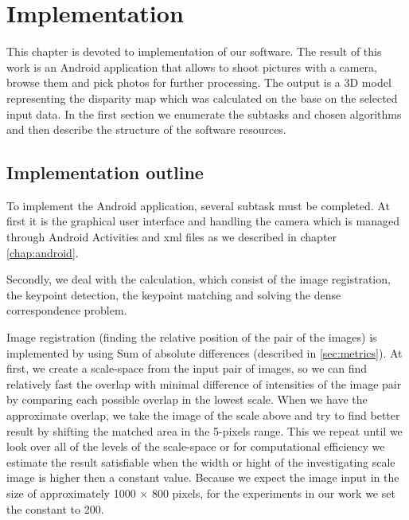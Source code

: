 
\chapter{Implementation}
\label{chap:implementation}

This chapter is devoted to implementation of our software.
The result of this work is an Android application that allows to shoot pictures with a camera, browse them and pick photos for further processing.
The output is a 3D model representing the disparity map which was calculated on the base on the selected input data.
In the first section we enumerate the subtasks and chosen algorithms and then describe the structure of the software resources.
 
\section{Implementation outline}
To implement the Android application, several subtask must be completed.
At first it is the graphical user interface and handling the camera which is managed through Android Activities and xml files as we described in chapter \ref{chap:android}.

Secondly, we deal with the calculation, which consist of the image registration, the keypoint detection, the keypoint matching and solving the dense correspondence problem.

Image registration (finding the relative position of the pair of the images) is implemented by using Sum of absolute differences (described in \ref{sec:metrics}).
At first, we create a scale-space from the input pair of images, so we can find relatively fast the overlap with minimal difference of intensities of the image pair by comparing each possible overlap in the lowest scale. 
When we have the approximate overlap, we take the image of the scale above and try to find better result by shifting the matched area in the 5-pixels range.
This we repeat until we look over all of the levels of the scale-space or for computational efficiency we estimate the result satisfiable when the width or hight of the investigating scale image is higher then a constant value.
Because we expect the image input in the size of approximately 1000 $\times$ 800 pixels, for the experiments in our work we set the constant to 200. 

